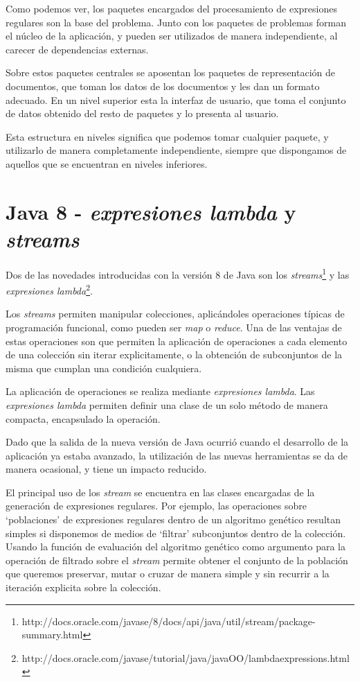 
Como podemos ver, los paquetes encargados del procesamiento de expresiones regulares son la base del problema.
Junto con los paquetes de problemas forman el núcleo de la aplicación, y pueden ser utilizados de manera independiente, al carecer de dependencias externas.

Sobre estos paquetes centrales se aposentan los paquetes de representación de documentos, que toman los datos de los documentos y les dan un formato adecuado.
En un nivel superior esta la interfaz de usuario, que toma el conjunto de datos obtenido del resto de paquetes y lo presenta al usuario.

Esta estructura en niveles significa que podemos tomar cualquier paquete, y utilizarlo de manera completamente independiente, siempre que dispongamos de aquellos que se encuentran en niveles inferiores.

\section{Java 8 - \emph{expresiones lambda} y \emph{streams}}
Dos de las novedades introducidas con la versión 8 de Java son los \emph{streams}\footnote{http://docs.oracle.com/javase/8/docs/api/java/util/stream/package-summary.html} y las \emph{expresiones lambda}\footnote{http://docs.oracle.com/javase/tutorial/java/javaOO/lambdaexpressions.html}.

Los \emph{streams} permiten manipular colecciones, aplicándoles operaciones típicas de programación funcional, como pueden ser \emph{map} o \emph{reduce}.
Una de las ventajas de estas operaciones son que permiten la aplicación de operaciones a cada elemento de una colección sin iterar explicitamente, o la obtención de subconjuntos de la misma que cumplan una condición cualquiera.

La aplicación de operaciones se realiza mediante \emph{expresiones lambda}.
Las \emph{expresiones lambda} permiten definir una clase de un solo método de manera compacta, encapsulado la operación.

Dado que la salida de la nueva versión de Java ocurrió cuando el desarrollo de la aplicación ya estaba avanzado, la utilización de las nuevas herramientas se da de manera ocasional, y tiene un impacto reducido.

El principal uso de los \emph{stream} se encuentra en las clases encargadas de la generación de expresiones regulares.
Por ejemplo, las operaciones sobre `poblaciones' de expresiones regulares dentro de un algoritmo genético resultan simples si disponemos de medios de `filtrar' subconjuntos dentro de la colección.
Usando la función de evaluación del algoritmo genético como argumento para la operación de filtrado sobre el \emph{stream} permite obtener el conjunto de la población que queremos preservar, mutar o cruzar de manera simple y sin recurrir a la iteración explicita sobre la colección.